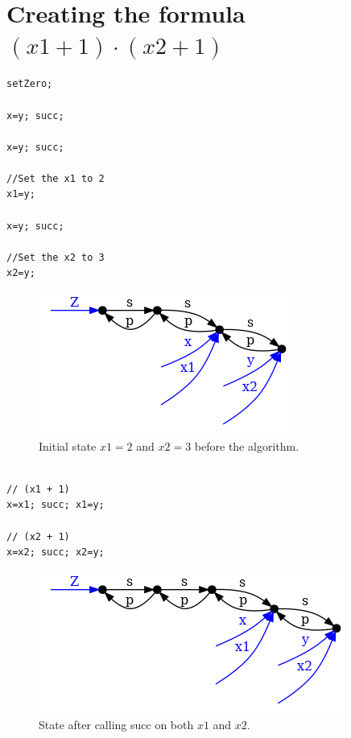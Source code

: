 \documentclass[a4paper,12px]{article}
\begin{document}
\newcommand{\Sum}[2]{\sum^{#2}_{#1}}
\newcommand{\E}[1]{{\mathbb{E}\left[#1\right]}}
\newcommand{\var}[1]{{\text{var}\left[#1\right]}}
\newcommand{\diffpart}[1]{\frac{\partial}{\partial{} #1}}
\newcommand{\?}{\stackrel{?}{=}}
\newcommand{\intinf}{\int\limits_{-\infty}^{\infty}}
\newcommand{\intnulinf}{\int\limits_{0}^{\infty}}
\newcommand{\intpi}{\int\limits_{0}^{2\pi}}
\newcommand{\argmin}[1]{\underset{#1}{\mathop{\mathrm{argmin}}}}
\newcommand{\argmax}[1]{\underset{#1}{\mathop{\mathrm{argmax}}}}


\section{Creating the formula $(x1+1)\cdot(x2+1)$}

\begin{verbatim}
setZero;

x=y; succ;

x=y; succ;

//Set the x1 to 2
x1=y;

x=y; succ;

//Set the x2 to 3
x2=y;
\end{verbatim}

\begin{figure}[h]
    \centering
    \includegraphics[width=0.8\linewidth]{f1.png}
    \caption{Initial state $x1=2$ and $x2=3$ before the algorithm.}
\end{figure}
\FloatBarrier%

\begin{verbatim}

// (x1 + 1)
x=x1; succ; x1=y;

// (x2 + 1)
x=x2; succ; x2=y;

\end{verbatim}

\begin{figure}[h]
    \centering
    \includegraphics[width=0.8\linewidth]{f2.png}
    \caption{State after calling succ on both $x1$ and $x2$.}
\end{figure}
\FloatBarrier%
\end{document}
